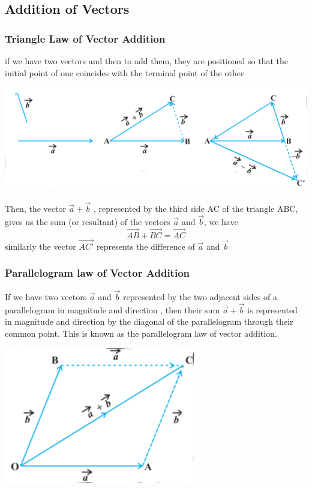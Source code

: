 \documentclass[12pt]{article}
\begin{document}
\begin{multicols*}{2}
\subsection*{Addition of Vectors}
\subsubsection*{Triangle Law of Vector Addition}
if we have two vectors and  then to add them, they are
positioned so that the initial point of one coincides with the terminal point of the other

\includegraphics*[scale=0.4]{5.png}

Then, the vector $\vec{a}+\vec{b}$ , represented by the third side AC of the triangle ABC, gives us the sum (or
resultant) of the vectors  $\vec{a}$ and $\vec{b}$, we have $$\vec{AB}+\vec{BC}=\vec{AC}$$ similarly the vector $\vec{AC'}$ represents the difference of $\vec{a}$ and $\vec{b}$

\subsubsection*{Parallelogram law of Vector Addition}
If we have two vectors $\vec{a}$ and $\vec{b}$ represented
by the two adjacent sides of a parallelogram
in magnitude and direction , then their
sum $\vec{a}+\vec{b}$
is represented in magnitude and
direction by the diagonal of the parallelogram
through their common point. This is known as
the parallelogram law of vector addition.

\includegraphics*[scale =0.5]{6.png}


\end{multicols*}
\end{document}
